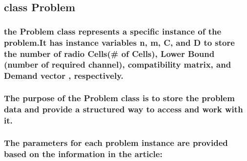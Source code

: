 \documentclass[11pt]{article}
\begin{document}
    \hypertarget{class-problem}{%
\subsection{\texorpdfstring{ class
Problem}{  class Problem}}\label{class-problem}}

\hypertarget{the-problem-class-represents-a-specific-instance-of-the-problem.it-has-instance-variables-n-m-c-and-d-to-store-the-number-of-radio-cells-of-cells-lower-bound-number-of-required-channel-compatibility-matrix-and-demand-vector-respectively.}{%
\subsubsection{\texorpdfstring{ the Problem class represents a specific
instance of the problem.It has instance variables n, m, C, and D to
store the number of radio Cells(\# of Cells), Lower Bound (number of
required channel), compatibility matrix, and Demand vector ,
respectively.}{  the Problem class represents a specific instance of the problem.It has instance variables n, m, C, and D to store the number of radio Cells(\# of Cells), Lower Bound (number of required channel), compatibility matrix, and Demand vector , respectively.}}\label{the-problem-class-represents-a-specific-instance-of-the-problem.it-has-instance-variables-n-m-c-and-d-to-store-the-number-of-radio-cells-of-cells-lower-bound-number-of-required-channel-compatibility-matrix-and-demand-vector-respectively.}}

\hypertarget{the-purpose-of-the-problem-class-is-to-store-the-problem-data-and-provide-a-structured-way-to-access-and-work-with-it.}{%
\subsubsection{\texorpdfstring{ The purpose of the Problem class is to
store the problem data and provide a structured way to access and work
with
it.}{  The purpose of the Problem class is to store the problem data and provide a structured way to access and work with it.}}\label{the-purpose-of-the-problem-class-is-to-store-the-problem-data-and-provide-a-structured-way-to-access-and-work-with-it.}}

\hypertarget{the-parameters-for-each-problem-instance-are-provided-based-on-the-information-in-the-article}{%
\subsubsection{\texorpdfstring{ The parameters for each problem instance
are provided based on the information in the
article:}{ The parameters for each problem instance are provided based on the information in the article:}}\label{the-parameters-for-each-problem-instance-are-provided-based-on-the-information-in-the-article}}
\end{document}
